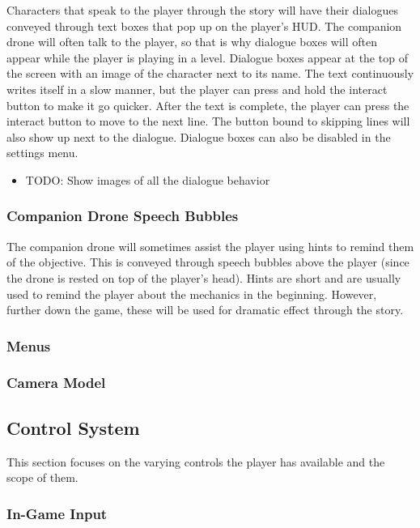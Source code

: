 \documentclass[12pt]{article}
\begin{document}
Characters that speak to the player through the story will have their dialogues conveyed through text boxes that pop up on the player's HUD. The companion drone will often talk to the player, so that is why dialogue boxes will often appear while the player is playing in a level. Dialogue boxes appear at the top of the screen with an image of the character next to its name. The text continuously writes itself in a slow manner, but the player can press and hold the interact button to make it go quicker. After the text is complete, the player can press the interact button to move to the next line. The button bound to skipping lines will also show up next to the dialogue. Dialogue boxes can also be disabled in the settings menu. 

\begin{itemize}
	\item TODO: Show images of all the dialogue behavior
\end{itemize}

\subsubsection{Companion Drone Speech Bubbles}

The companion drone will sometimes assist the player using hints to remind them of the objective. This is conveyed through speech bubbles above the player (since the drone is rested on top of the player's head). Hints are short and are usually used to remind the player about the mechanics in the beginning. However, further down the game, these will be used for dramatic effect through the story.

\subsubsection{Menus}

\subsubsection{Camera Model}

\subsection{Control System}

This section focuses on the varying controls the player has available and the scope of them. 

\subsubsection{In-Game Input}
\end{document}
